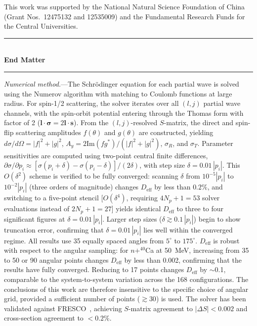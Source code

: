 \documentclass[aps,prl,reprint,superscriptaddress,showpacs]{revtex4-2}
\begin{document}
\begin{acknowledgments}
This work was supported by the National Natural Science Foundation of China (Grant Nos.~12475132 and 12535009) and the Fundamental Research Funds for the Central Universities.
\end{acknowledgments}



\onecolumngrid
\bigskip
\begin{center}
\rule{0.5\columnwidth}{0.5pt}\\[6pt]
{\large\textbf{End Matter}}\\[6pt]
\rule{0.5\columnwidth}{0.5pt}
\end{center}
\twocolumngrid

\textit{Numerical method.}---The Schr\"odinger equation for each partial wave is solved using the Numerov algorithm with matching to Coulomb functions at large radius. For spin-1/2 scattering, the solver iterates over all $(l, j)$ partial wave channels, with the spin-orbit potential entering through the Thomas form with factor of 2 ($\mathbf{l}\cdot\boldsymbol{\sigma} = 2\mathbf{l}\cdot\mathbf{s}$). From the $(l,j)$-resolved $S$-matrix, the direct and spin-flip scattering amplitudes $f(\theta)$ and $g(\theta)$ are constructed, yielding $d\sigma/d\Omega = |f|^2 + |g|^2$, $A_y = 2\mathrm{Im}(fg^*) / (|f|^2 + |g|^2)$, $\sigma_R$, and $\sigma_T$. Parameter sensitivities are computed using two-point central finite differences, $\partial\sigma/\partial p_i \approx [\sigma(p_i+\delta)-\sigma(p_i-\delta)]/(2\delta)$, with step size $\delta = 0.01\,|p_i|$. This $O(\delta^2)$ scheme is verified to be fully converged: scanning $\delta$ from $10^{-5}|p_i|$ to $10^{-2}|p_i|$ (three orders of magnitude) changes $D_\mathrm{eff}$ by less than $0.2\%$, and switching to a five-point stencil [$O(\delta^4)$, requiring $4N_p+1=53$ solver evaluations instead of $2N_p+1=27$] yields identical $D_\mathrm{eff}$ to three to four significant figures at $\delta = 0.01\,|p_i|$. Larger step sizes ($\delta \gtrsim 0.1\,|p_i|$) begin to show truncation error, confirming that $\delta = 0.01\,|p_i|$ lies well within the converged regime. All results use 35 equally spaced angles from $5^\circ$ to $175^\circ$. $D_\mathrm{eff}$ is robust with respect to the angular sampling: for $n+^{40}$Ca at 50~MeV, increasing from 35 to 50 or 90 angular points changes $D_\mathrm{eff}$ by less than 0.002, confirming that the results have fully converged. Reducing to 17 points changes $D_\mathrm{eff}$ by $\sim$0.1, comparable to the system-to-system variation across the 168 configurations. The conclusions of this work are therefore insensitive to the specific choice of angular grid, provided a sufficient number of points ($\gtrsim 30$) is used. The solver has been validated against FRESCO~\cite{Thompson1988}, achieving $S$-matrix agreement to $|\Delta S| < 0.002$ and cross-section agreement to $< 0.2\%$.
\end{document}
